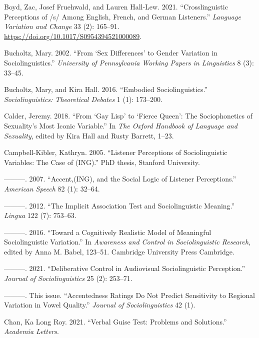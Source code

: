 \documentclass[
  letterpaper,
  DIV=11,
  numbers=noendperiod]{scrartcl}
\newlength{\cslhangindent}
\newenvironment{CSLReferences}[2] %
 {\begin{list}{}{%
  \setlength{\itemindent}{0pt}
  \setlength{\leftmargin}{0pt}
  \setlength{\parsep}{0pt}
  \ifodd #1
   \setlength{\leftmargin}{\cslhangindent}
   \setlength{\itemindent}{-1\cslhangindent}
  \fi
  \setlength{\itemsep}{#2\baselineskip}}}
 {\end{list}}
\begin{document}
\begin{CSLReferences}{1}{0}
Boyd, Zac, Josef Fruehwald, and Lauren Hall-Lew. 2021.
{``Crosslinguistic Perceptions of /s/ Among English, French, and German
Listeners.''} \emph{Language Variation and Change} 33 (2): 165--91.
\url{https://doi.org/10.1017/S0954394521000089}.

Bucholtz, Mary. 2002. {``From {`Sex Differences'} to Gender Variation in
Sociolinguistics.''} \emph{University of Pennsylvania Working Papers in
Linguistics} 8 (3): 33--45.

Bucholtz, Mary, and Kira Hall. 2016. {``Embodied Sociolinguistics.''}
\emph{Sociolinguistics: Theoretical Debates} 1 (1): 173--200.

Calder, Jeremy. 2018. {``From {`Gay Lisp'} to {`Fierce Queen'}: The
Sociophonetics of Sexuality's Most Iconic Variable.''} In \emph{The
Oxford Handbook of Language and Sexuality}, edited by Kira Hall and
Rusty Barrett, 1--23.

Campbell-Kibler, Kathryn. 2005. {``Listener Perceptions of
Sociolinguistic Variables: The Case of (ING).''} PhD thesis, Stanford
University.

---------. 2007. {``Accent,(ING), and the Social Logic of Listener
Perceptions.''} \emph{American Speech} 82 (1): 32--64.

---------. 2012. {``The Implicit Association Test and Sociolinguistic
Meaning.''} \emph{Lingua} 122 (7): 753--63.

---------. 2016. {``Toward a Cognitively Realistic Model of Meaningful
Sociolinguistic Variation.''} In \emph{Awareness and Control in
Sociolinguistic Research}, edited by Anna M. Babel, 123--51. Cambridge
University Press Cambridge.

---------. 2021. {``Deliberative Control in Audiovisual Sociolinguistic
Perception.''} \emph{Journal of Sociolinguistics} 25 (2): 253--71.

---------. This issue. {``Accentedness Ratings Do Not Predict
Sensitivity to Regional Variation in Vowel Quality.''} \emph{Journal of
Sociolinguistics} 42 (1).

Chan, Ka Long Roy. 2021. {``Verbal Guise Test: Problems and
Solutions.''} \emph{Academia Letters}.


\end{CSLReferences}
\end{document}
